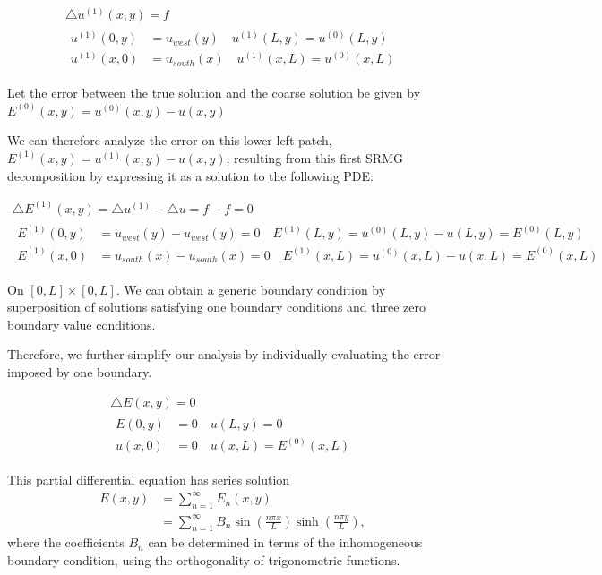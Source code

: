 \documentclass[final]{siamart1116}
\numberwithin{theorem}{section}
\begin{document}
\begin{gather}
  \bigtriangleup  u^{(1)}(x,y) = f  \\
  \begin{split}
    u^{(1)}(0,y) &= u_{west}(y) \quad u^{(1)}(L,y) = u^{(0)}(L, y) \\
    u^{(1)}(x,0) &= u_{south}(x) \quad u^{(1)}(x,L) = u^{(0)}(x, L) \nonumber
  \end{split}
\end{gather}

Let the error between the true solution and the coarse solution be given by $E^{(0)}(x, y) = u^{(0)}(x, y) - u(x, y)$

We can therefore analyze the error on this lower left patch, $E^{(1)}(x, y) = u^{(1)}(x, y) - u(x, y)$, resulting from this first SRMG decomposition  by expressing it as a solution to the following PDE: 

\begin{gather}
  \bigtriangleup  {E}^{(1)}(x,y) = \bigtriangleup u^{(1)} - \bigtriangleup u = f - f = 0 \\
  \begin{split}
    {E}^{(1)}(0,y) &= u_{west}(y) - u_{west}(y) = 0 \quad {E}^{(1)}(L,y) = u^{(0)}(L, y) - u(L, y) = E^{(0)}(L, y) \\
    {E}^{(1)} (x,0) &= u_{south}(x) - u_{south}(x) = 0 \quad E^{(1)}(x,L) = u^{(0)}(x, L) - u(x, L)  = E^{(0)}(x, L) \nonumber 
  \end{split}
\end{gather}



On $[0,L]\times[0,L]$. We can obtain a generic boundary condition by superposition of solutions satisfying one boundary conditions and three zero boundary value conditions. 

Therefore, we further simplify our analysis by individually evaluating the error imposed by one boundary. 

\begin{gather}
  \bigtriangleup  E(x,y) = 0 \label{laplaceexstate} \\
  \begin{split}
    E(0,y) &= 0 \quad u(L,y) = 0 \\
    u(x,0) &= 0 \quad u(x,L) = E^{(0)}(x, L) \label{laplaceexboundary} \nonumber 
  \end{split}
\end{gather}

This partial differential equation has series
solution \cite{Jackson1962}
\begin{align}
  E(x,y) &= \sum_{n=1}^{\infty} E_n(x,y) \label{errorinfreq} \\
            &= \sum_{n=1}^{\infty} B_n \sin\left(\frac{n\pi x}{L}\right) \sinh\left(\frac{n\pi y}{L}\right), \nonumber 
\end{align}
where the coefficients $B_n$ can be determined in terms of the inhomogeneous boundary condition, using the orthogonality of trigonometric functions. 
\end{document}
